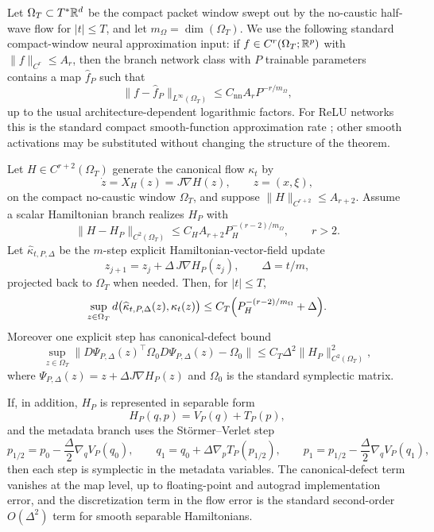 Let $\Omega_T\subset T^\ast\mathbb R^d$ be the compact packet window swept out by the no-caustic half-wave flow for $|t|\le T$, and let $m_\Omega=\dim(\Omega_T)$.  We use the following standard compact-window neural approximation input: if $f\in C^r(\Omega_T;\mathbb R^p)$ with $\|f\|_{C^r}\le A_r$, then the branch network class with $P$ trainable parameters contains a map $\hat f_P$ such that
\begin{equation}
\label{eq:branch-approx-rate}
\|f-\hat f_P\|_{L^\infty(\Omega_T)}
\le
C_{\mathrm{nn}}A_r P^{-r/m_\Omega},
\end{equation}
up to the usual architecture-dependent logarithmic factors.  For ReLU networks this is the standard compact smooth-function approximation rate \citep{yarotsky2017relu}; other smooth activations may be substituted without changing the structure of the theorem.

\begin{proposition}
\label{prop:hamiltonian-metadata-consistency}
Let $H\in C^{r+2}(\Omega_T)$ generate the canonical flow $\kappa_t$ by
\[
\dot z = X_H(z)=J\nabla H(z),
\qquad
z=(x,\xi),
\]
on the compact no-caustic window $\Omega_T$, and suppose $\|H\|_{C^{r+2}}\le A_{r+2}$.  Assume a scalar Hamiltonian branch realizes $H_P$ with
\[
\|H-H_P\|_{C^2(\Omega_T)}
\le
C_H A_{r+2}P_H^{-(r-2)/m_\Omega},
\qquad r>2.
\]
Let $\widehat\kappa_{t,P,\Delta}$ be the $m$-step explicit Hamiltonian-vector-field update
\[
z_{j+1}=z_j+\Delta\,J\nabla H_P(z_j),
\qquad
\Delta=t/m,
\]
projected back to $\Omega_T$ when needed.  Then, for $|t|\le T$,
\[
\sup_{z\in\Omega_T}
d\bigl(\widehat\kappa_{t,P,\Delta}(z),\kappa_t(z)\bigr)
\le
C_T\Bigl(P_H^{-(r-2)/m_\Omega}+\Delta\Bigr).
\]
Moreover one explicit step has canonical-defect bound
\[
\sup_{z\in\Omega_T}
\bigl\|D\Psi_{P,\Delta}(z)^\top\Omega_0D\Psi_{P,\Delta}(z)-\Omega_0\bigr\|
\le
C_T\Delta^2\|H_P\|_{C^2(\Omega_T)}^2,
\]
where $\Psi_{P,\Delta}(z)=z+\Delta J\nabla H_P(z)$ and $\Omega_0$ is the standard symplectic matrix.

If, in addition, $H_P$ is represented in separable form
\[
H_P(q,p)=V_P(q)+T_P(p),
\]
and the metadata branch uses the St\"ormer--Verlet step
\[
p_{1/2}=p_0-\frac{\Delta}{2}\nabla_qV_P(q_0),\qquad
q_1=q_0+\Delta\nabla_pT_P(p_{1/2}),\qquad
p_1=p_{1/2}-\frac{\Delta}{2}\nabla_qV_P(q_1),
\]
then each step is symplectic in the metadata variables.  The canonical-defect term vanishes at the map level, up to floating-point and autograd implementation error, and the discretization term in the flow error is the standard second-order $O(\Delta^2)$ term for smooth separable Hamiltonians.
\end{proposition}

